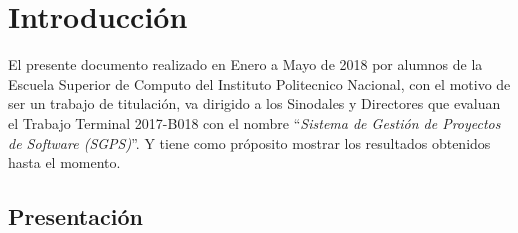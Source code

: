 \chapter{Introducción}


El presente documento realizado en Enero a Mayo de 2018 por alumnos de la Escuela Superior de Computo del Instituto Politecnico Nacional, con el motivo de ser un trabajo de titulación, va dirigido a los Sinodales y Directores que evaluan el Trabajo Terminal 2017-B018 con el nombre 
``{\em Sistema de Gestión de Proyectos de Software (SGPS)}''. Y tiene como próposito mostrar los resultados obtenidos hasta el momento.

\section{Presentación}



